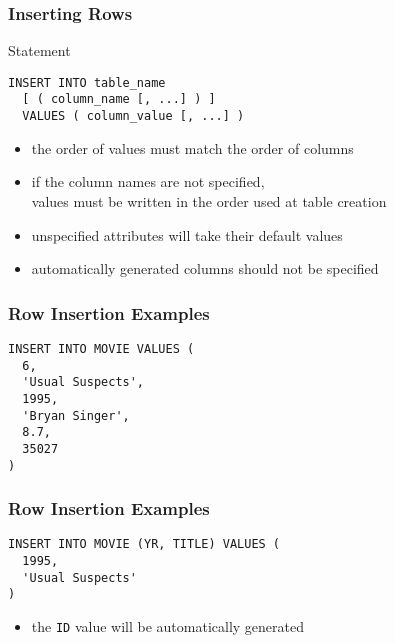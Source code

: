 \documentclass[dvipsnames]{beamer}
\theoremstyle{plain}
\begin{document}
\begin{frame}[fragile]
  \frametitle{Inserting Rows}

  \begin{block}{Statement}
    \begin{lstlisting}
INSERT INTO table_name
  [ ( column_name [, ...] ) ]
  VALUES ( column_value [, ...] )
    \end{lstlisting}
  \end{block}

  \pause
  \begin{itemize}
    \item the order of values must match the order of columns
    \item if the column names are not specified,\\
      values must be written in the order used at table creation
    \item unspecified attributes will take their default values

    \pause
    \medskip
    \item automatically generated columns should not be specified
  \end{itemize}
\end{frame}

\begin{frame}[fragile]
  \frametitle{Row Insertion Examples}

  \begin{example}
    \begin{lstlisting}
INSERT INTO MOVIE VALUES (
  6,
  'Usual Suspects',
  1995,
  'Bryan Singer',
  8.7,
  35027
)
    \end{lstlisting}
  \end{example}
\end{frame}

\begin{frame}[fragile]
  \frametitle{Row Insertion Examples}

  \begin{example}
    \begin{lstlisting}
INSERT INTO MOVIE (YR, TITLE) VALUES (
  1995,
  'Usual Suspects'
)
    \end{lstlisting}

    \pause
    \begin{itemize}
      \item the \texttt{ID} value will be automatically generated
    \end{itemize}
  \end{example}
\end{frame}
\end{document}
